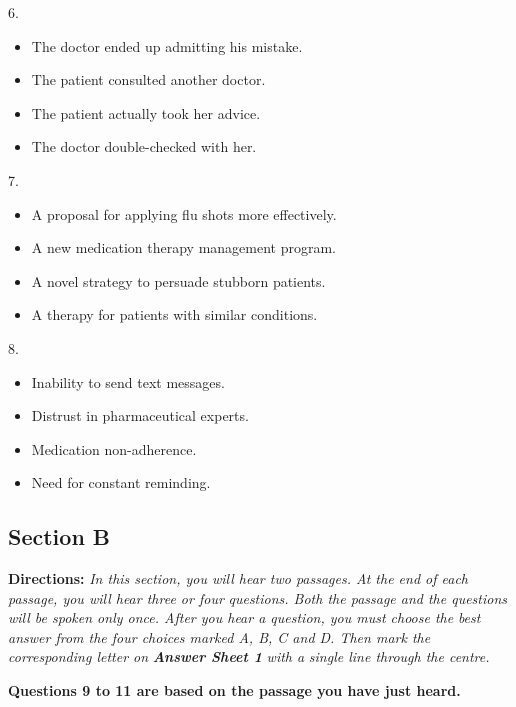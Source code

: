 \documentclass[UTF8,11pt]{ctexart}
\begin{document}
6.


\begin{itemize}[leftmargin=2em,itemsep=.2em,topsep=.4em]\item[A.] The doctor ended up admitting his mistake.
\item[B.] The patient consulted another doctor.
\item[C.] The patient actually took her advice.
\item[D.] The doctor double-checked with her.
\end{itemize}

7.


\begin{itemize}[leftmargin=2em,itemsep=.2em,topsep=.4em]\item[A.] A proposal for applying flu shots more effectively.
\item[B.] A new medication therapy management program.
\item[C.] A novel strategy to persuade stubborn patients.
\item[D.] A therapy for patients with similar conditions.
\end{itemize}

8.


\begin{itemize}[leftmargin=2em,itemsep=.2em,topsep=.4em]\item[A.] Inability to send text messages.
\item[B.] Distrust in pharmaceutical experts.
\item[C.] Medication non-adherence.
\item[D.] Need for constant reminding.
\end{itemize}

\subsection*{\textbf{Section B}}


\textbf{Directions:} \textit{In this section, you will hear two passages. At the end of each passage, you will hear three or four} \textit{questions. Both the passage and the questions will be spoken only once. After you hear a question, you must choose the} \textit{best answer from the four choices marked A, B, C and D. Then mark the corresponding letter on }\textbf{\textit{Answer Sheet 1}}\textit{ with a} \textit{single line through the centre.}


\textbf{Questions 9 to 11 are based on the passage you have just heard.}
\end{document}
